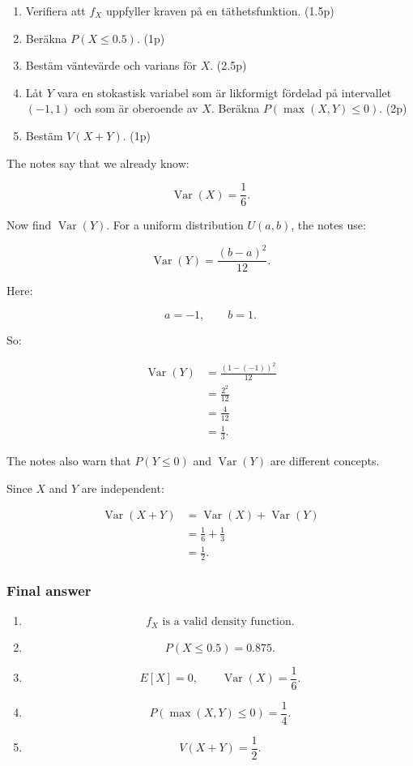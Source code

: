 \documentclass[10pt]{article}
\begin{document}
\begin{enumerate}[label=\alph*)]
\item Verifiera att \(f_X\) uppfyller kraven på en
täthetsfunktion.
\hfill (1.5p)

\item Beräkna \(P(X\le 0.5)\).
\hfill (1p)

\item Bestäm väntevärde och varians för \(X\).
\hfill (2.5p)

\item Låt \(Y\) vara en stokastisk variabel som är
likformigt fördelad på intervallet \((-1,1)\) och som
är oberoende av \(X\).
Beräkna \(P(\max(X,Y)\le 0)\).
\hfill (2p)

\item Bestäm \(V(X+Y)\).
\hfill (1p)
\end{enumerate}

The notes say that we already know:

\[
\operatorname{Var}(X)=\frac{1}{6}.
\]

Now find \(\operatorname{Var}(Y)\).
For a uniform distribution \(U(a,b)\), the notes use:

\[
\operatorname{Var}(Y)
=
\frac{(b-a)^2}{12}.
\]

Here:

\[
a=-1,
\qquad
b=1.
\]

So:

\begin{align*}
\operatorname{Var}(Y)
&=
\frac{(1-(-1))^2}{12} \\[2mm]
&=
\frac{2^2}{12} \\[2mm]
&=
\frac{4}{12} \\[2mm]
&=
\frac{1}{3}.
\end{align*}

The notes also warn that
\(P(Y\le 0)\) and \(\operatorname{Var}(Y)\)
are different concepts.

Since \(X\) and \(Y\) are independent:

\begin{align*}
\operatorname{Var}(X+Y)
&=
\operatorname{Var}(X)
+
\operatorname{Var}(Y) \\[2mm]
&=
\frac{1}{6}
+
\frac{1}{3} \\[2mm]
&=
\frac{1}{2}.
\end{align*}

\subsubsection*{Final answer}
\begin{enumerate}[label=\alph*)]
\item
\[
f_X
\text{ is a valid density function.}
\]

\item
\[
P(X\le 0.5)=0.875.
\]

\item
\[
E[X]=0,
\qquad
\operatorname{Var}(X)=\frac{1}{6}.
\]

\item
\[
P(\max(X,Y)\le 0)=\frac{1}{4}.
\]

\item
\[
V(X+Y)=\frac{1}{2}.
\]
\end{enumerate}
\end{document}
